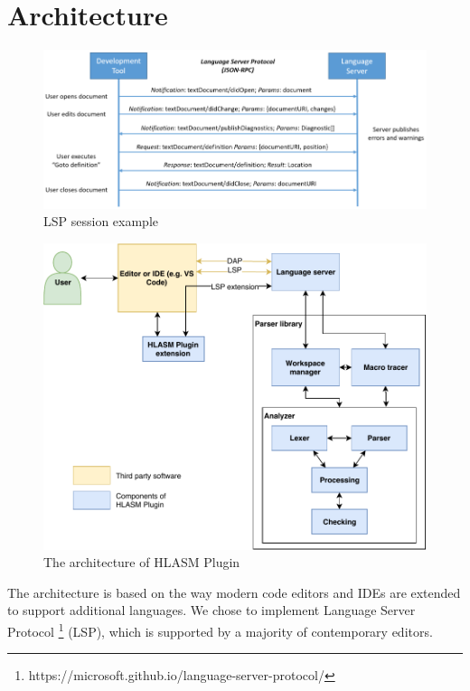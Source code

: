 \chapter{Architecture}


\begin{figure}
	\centering
	\includegraphics[width=\textwidth]{img/language-server-sequence}
	\caption{LSP session example }
	\label{fig04:LSP}
\end{figure}

\begin{figure}
	\centering
	\includegraphics[width=\textwidth]{img/hlasm_architecture}
	\caption{The architecture of HLASM Plugin}
	\label{fig04:arch}
\end{figure}



The architecture is based on the way modern code editors and IDEs are extended to support additional languages. We chose to implement Language Server Protocol \footnote{https://microsoft.github.io/language-server-protocol/} (LSP), which is supported by a majority of contemporary editors.

